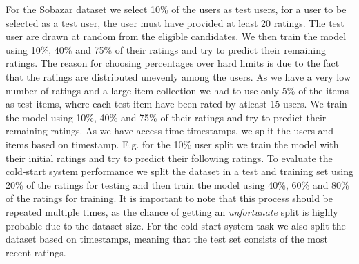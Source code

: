 For the Sobazar dataset we select 10\% of the users as test users, for a user
to be selected as a test user, the user must have provided at least 20 ratings.
The test user are drawn at random from the eligible candidates. We then train
the model using 10\%, 40\% and 75\% of their ratings and try to predict their
remaining ratings.  The reason for choosing percentages over hard limits is due
to the fact that the ratings are distributed unevenly among the users. As we
have a very low number of ratings and a large item collection we had to use
only 5\% of the items as test items, where each test item have been rated by
atleast 15 users.  We train the model using 10\%, 40\% and 75\% of their
ratings and try to predict their remaining ratings. As we have access time
timestamps, we split the users and items based on timestamp.  E.g. for the 10\%
user split we train the model with their initial ratings and try to predict
their following ratings. To evaluate the cold-start system performance we split
the dataset in a test and training set using 20\% of the ratings for testing
and then train the model using 40\%, 60\% and 80\% of the ratings for training.
It is important to note that this process should be repeated multiple times, as
the chance of getting an \emph{unfortunate} split is highly probable due to the
dataset size. For the cold-start system task we also split the dataset based on
timestamps, meaning that the test set consists of the most recent ratings.

